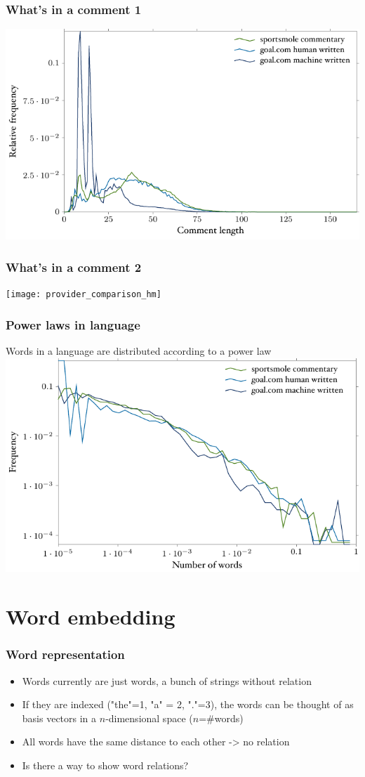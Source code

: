 \documentclass{beamer}
\begin{document}
\begin{frame}
\frametitle{What's in a comment 1}
\includegraphics[width=\textwidth]{figures/fig_commentary_full.pdf}
\end{frame}

\begin{frame}
\frametitle{What's in a comment 2}
\texttt{[image: provider\_comparison\_hm]}
\end{frame}

\begin{frame}
\frametitle{Power laws in language}
Words in a language are distributed according to a power law
\includegraphics[width=.8\textwidth]{figures/fig_word_freq_full.pdf}
\end{frame}

\section{Word embedding}

\begin{frame}
\frametitle{Word representation}
\begin{itemize}
\item Words currently are just words, a bunch of strings without relation
\item If they are indexed ("the"=1, "a" = 2, "."=3), the words can be thought of as basis vectors in a $n$-dimensional space ($n$=\#words)
\item All words have the same distance to each other -> no relation
\item Is there a way to show word relations?
\end{itemize}
\end{frame}
\end{document}
